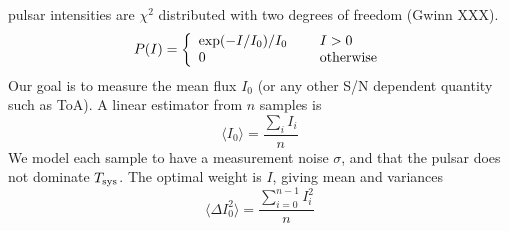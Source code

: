 \documentclass{article}
\begin{document}
pulsar intensities are $\chi^2$ distributed with two degrees of
freedom (Gwinn XXX).  
\begin{equation}
P(I)=\left\{\begin{array}{ll}
\exp(-I/I_0)/I_0 \ \ \ \ & I>0 \\
             0 & {\rm otherwise}
\end{array}
\right.
\end{equation}
Our goal is to measure the mean flux $I_0$ (or any other S/N dependent
quantity such as ToA).  A linear estimator from $n$ samples is
\begin{equation}
\langle I_0 \rangle = \frac{\sum_{i} I_i}{n}
\end{equation}
We model each sample to have a measurement noise $\sigma$, and that
the pulsar does not dominate $T_{\rm sys}$.  The optimal weight is
$I$, giving mean and variances
\begin{equation}
\langle \Delta I_0^2 \rangle = \frac{\sum_{i=0}^{n-1} I^2_i}{n}
\end{equation}
\end{document}

